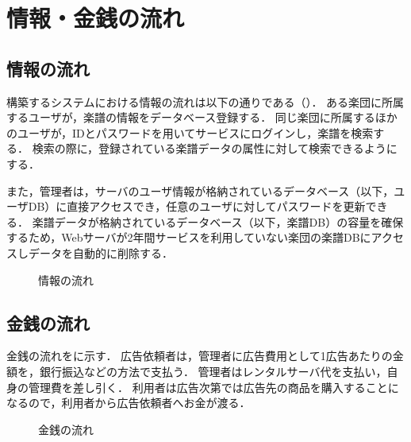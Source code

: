 \chapter{情報・金銭の流れ}
\section*{情報の流れ}\label{sec:情報の流れ}
構築するシステムにおける情報の流れは以下の通りである（）．
ある楽団に所属するユーザが，楽譜の情報をデータベース登録する．
同じ楽団に所属するほかのユーザが，IDとパスワードを用いてサービスにログインし，楽譜を検索する．
検索の際に，登録されている楽譜データの属性に対して検索できるようにする．\par
また，管理者は，サーバのユーザ情報が格納されているデータベース（以下，ユーザDB）に直接アクセスでき，任意のユーザに対してパスワードを更新できる．
楽譜データが格納されているデータベース（以下，楽譜DB）の容量を確保するため，Webサーバが2年間サービスを利用していない楽団の楽譜DBにアクセスしデータを自動的に削除する．
\begin{figure}[p]
	\centering
	
	\caption{情報の流れ}
	\label{fig:情報の流れ}
\end{figure}
\section*{金銭の流れ}\label{sec:金銭の流れ}
金銭の流れをに示す．
広告依頼者は，管理者に広告費用として1広告あたりの金額を，銀行振込などの方法で支払う．
管理者はレンタルサーバ代を支払い，自身の管理費を差し引く．
利用者は広告次第では広告先の商品を購入することになるので，利用者から広告依頼者へお金が渡る．
\begin{figure}[p]
	\centering
	
	\caption{金銭の流れ}
	\label{fig:金銭の流れ}
\end{figure}